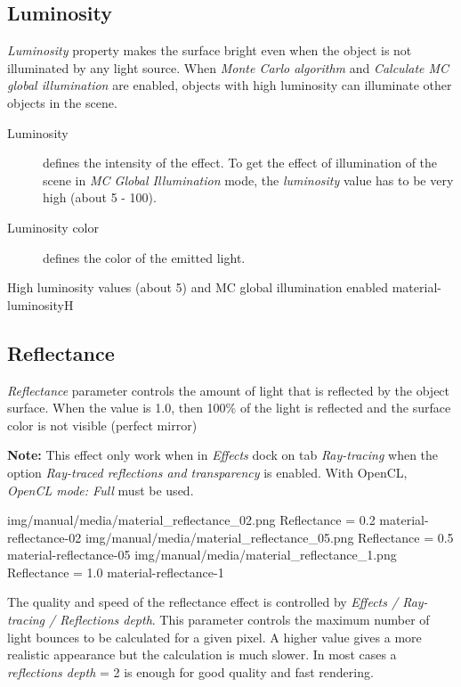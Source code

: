\subsection{Luminosity}\label{materials-luminosity}

\emph{Luminosity} property makes the surface bright even when the object is not illuminated by any light source. When \emph{Monte Carlo algorithm} and \emph{Calculate MC global illumination} are enabled, objects with high luminosity can illuminate other objects in the scene. 

\begin{description}
	\item[Luminosity] defines the intensity of the effect. To get the effect of illumination of the scene in\emph{ MC Global Illumination} mode, the \emph{luminosity} value has to be very high (about 5 - 100). 
	\item[Luminosity color] defines the color of the emitted light.
\end{description}

{High luminosity values (about 5) and MC global illumination enabled}
{material-luminosity}{H}

\subsection{Reflectance}\label{materials-reflectance}

\emph{Reflectance} parameter controls the amount of light that is reflected by the object surface. When the value is 1.0, then 100\% of the light is reflected and the surface color is not visible (perfect mirror)

\textbf{Note: }This effect only work when in \emph{Effects} dock on tab \emph{Ray-tracing} when the option \emph{Ray-traced reflections and transparency} is enabled. With OpenCL, \emph{OpenCL mode: Full} must be used.

\threeImagesWithTwoCaptionsFullWidth
{img/manual/media/material_reflectance_02.png}
{Reflectance = 0.2}
{material-reflectance-02}
{img/manual/media/material_reflectance_05.png}
{Reflectance = 0.5}
{material-reflectance-05}
{img/manual/media/material_reflectance_1.png}
{Reflectance = 1.0}
{material-reflectance-1}

The quality and speed of the reflectance effect is controlled by \emph{Effects / Ray-tracing / Reflections depth}. This parameter controls the maximum number of light bounces to be calculated for a given pixel. A higher value gives a more realistic appearance but the calculation is much slower. In most cases a \emph{reflections depth} = 2 is enough for good quality and fast rendering.

